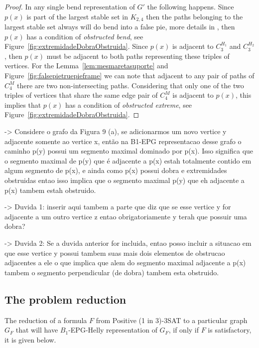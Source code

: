 \documentclass[a4paper,11pt]{article}
\begin{document}
\begin{proof}
In any single bend representation of $ G'$ the following happens. Since $ p(x) $ is part of the largest stable set in $ K_{2,4} $ then the paths belonging to the largest stable set always will do bend into a false pie, more details in \citep{Asinowski2009}, then $ p(x) $ has a condition of \emph {obstructed bend}, see Figure~\ref{fig:extremidadeDobraObstruida}. Since $ p(x) $ is adjacent to $ C_{3}^{H_1}$ and $ C_3^{H_2}$, then $ p(x) $ must be adjacent to both paths representing these triples of vertices. For the Lemma~\ref{lem:mesmaretasuporte} and Figure~\ref{fig:falsepietruepieframe} we can note that adjacent to any pair of paths of $ C_4^M $ there are two non-intersecting paths. Considering that only one of the two triples of vertices that share the same edge pair of $ C_4^M $ is adjacent to $ p(x) $, this implies that $ p(x) $ has a condition of \emph{obstructed extreme}, see Figure~\ref{fig:extremidadeDobraObstruida}.
\end{proof}



-> Considere o grafo da Figura 9 (a), se adicionarmos um novo vertice y adjacente somente ao vertice x, então na B1-EPG representacao desse grafo o caminho p(y) possui um segmento maximal dominado por p(x). Isso significa que o segmento maximal de p(y) que é adjacente a p(x) estah totalmente contido em algum segmento de p(x), e ainda como p(x) possui dobra e extremidades obstruidas entao isso implica que o segmento maximal p(y) que eh adjacente a p(x) tambem estah obstruido.

-> Duvida 1: inserir aqui tambem a parte que diz que se esse vertice y for adjacente a um outro vertice z entao obrigatoriamente y terah que possuir uma dobra?

-> Duvida 2: Se a duvida anterior for incluida, entao posso incluir a situacao em que esse vertice y possui tambem suas mais dois elementos de obstrucao adjacentes a ele o que implica que alem do segmento maximal adjacente a p(x) tambem o segmento perpendicular (de dobra) tambem esta obstruido.  


\subsection{The problem reduction}\label{sec:reducao}

The reduction of a formula $F$ from  {\sc Positive (1 in 3)-3SAT}  to a particular graph $G_F$ that will have  $B_{1}$-EPG-Helly representation of $G_F$, if only if $F$ is satisfactory, it is given below.
\end{document}
